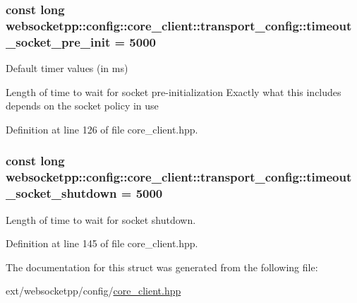 \subsubsection[{timeout\+\_\+socket\+\_\+pre\+\_\+init}]{\setlength{\rightskip}{0pt plus 5cm}const long websocketpp\+::config\+::core\+\_\+client\+::transport\+\_\+config\+::timeout\+\_\+socket\+\_\+pre\+\_\+init = 5000\hspace{0.3cm}{\ttfamily [static]}}\label{structwebsocketpp_1_1config_1_1core__client_1_1transport__config_a529a1a4bf59b86dfebbf0e65b3b1ce25}


Default timer values (in ms) 

Length of time to wait for socket pre-\/initialization Exactly what this includes depends on the socket policy in use 

Definition at line 126 of file core\+\_\+client.\+hpp.

\hypertarget{structwebsocketpp_1_1config_1_1core__client_1_1transport__config_a1b3c52afc3596f891611208c0773bc8c}{}
\subsubsection[{timeout\+\_\+socket\+\_\+shutdown}]{\setlength{\rightskip}{0pt plus 5cm}const long websocketpp\+::config\+::core\+\_\+client\+::transport\+\_\+config\+::timeout\+\_\+socket\+\_\+shutdown = 5000\hspace{0.3cm}{\ttfamily [static]}}\label{structwebsocketpp_1_1config_1_1core__client_1_1transport__config_a1b3c52afc3596f891611208c0773bc8c}


Length of time to wait for socket shutdown. 



Definition at line 145 of file core\+\_\+client.\+hpp.



The documentation for this struct was generated from the following file\+:\begin{DoxyCompactItemize}
\item 
ext/websocketpp/config/\hyperlink{core__client_8hpp}{core\+\_\+client.\+hpp}\end{DoxyCompactItemize}
